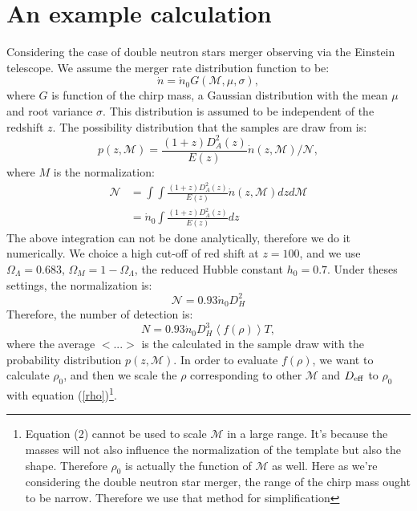 \documentclass[fleqn,usenatbib]{mnras}
\begin{document}
\section{An example calculation}
Considering the case of double neutron stars merger observing via the Einstein telescope. We assume the merger rate distribution function to be:
\begin{equation}
    \dot{n}=\dot{n}_0G(\mathcal{M},\mu,\sigma),
\end{equation}
where $G$ is function of the chirp mass, a Gaussian distribution with the mean $\mu$ and root variance $\sigma$. This distribution is assumed to be independent of the redshift $z$. The possibility distribution that the samples are draw from is:
\begin{equation}
    p(z,\mathcal{M})=\frac{(1+z)D^2_A(z)}{E(z)}\dot{n}(z,\mathcal{M})/\mathcal{N}, 
\end{equation}
where $M$ is the normalization: 
\begin{align}
    \mathcal{N}&=\int\int\frac{(1+z)D^2_A(z)}{E(z)}\dot{n}(z,\mathcal{M})dzd\mathcal{M}\\\nonumber
               &=\dot{n}_0\int\frac{(1+z)D^2_A(z)}{E(z)}dz
\end{align}
The above integration can not be done analytically, therefore we do it numerically.  We choice a high cut-off of red shift at $z=100$, and we use $\Omega_\Lambda=0.683$, $\Omega_M=1-\Omega_\Lambda$, the reduced Hubble constant $h_0=0.7$. Under theses settings, the normalization is:
\begin{equation}
    \mathcal{N}=0.93\dot{n}_0D^2_H
\end{equation}
Therefore, the number of detection is:
\begin{equation}
    N=0.93\dot{n}_0D_H^3\left<f(\rho)\right>T,
    \label{eqn:number}
\end{equation}
where the average $<...>$ is the calculated in the sample draw with the probability distribution $p(z,\mathcal{M})$. 
In order to evaluate $f(\rho)$, we want to calculate $\rho_0$, and then we scale the $\rho$ corresponding to other $\mathcal{M}$ and $D_{\rm{eff}}$ to $\rho_0$ with equation (\ref{rho})\footnote{Equation (2) cannot be used to scale $\mathcal{M}$ in a large range. It's because the masses will not also influence the normalization of the template but also the shape. Therefore $\rho_0$ is actually the function of $\mathcal{M}$ as well. Here as we're considering the double neutron star merger, the range of the chirp mass ought to be narrow. Therefore we use that method for simplification}. 
\end{document}
